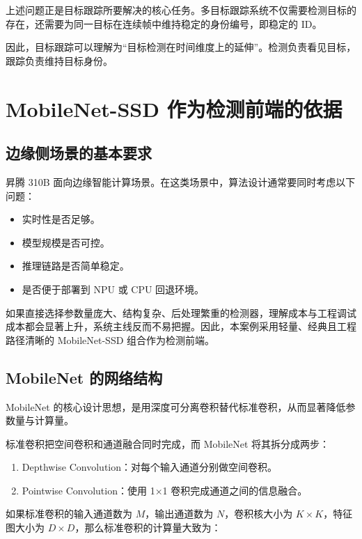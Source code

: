 上述问题正是目标跟踪所要解决的核心任务。多目标跟踪系统不仅需要检测目标的存在，还需要为同一目标在连续帧中维持稳定的身份编号，即稳定的
ID。

因此，目标跟踪可以理解为``目标检测在时间维度上的延伸''。检测负责看见目标，跟踪负责维持目标身份。

\section{MobileNet-SSD
作为检测前端的依据}\label{src-experiment-case2-h5}

\subsection{边缘侧场景的基本要求}\label{src-experiment-case2-h6}

昇腾 310B
面向边缘智能计算场景。在这类场景中，算法设计通常要同时考虑以下问题：

\begin{itemize}
\tightlist
\item
  实时性是否足够。
\item
  模型规模是否可控。
\item
  推理链路是否简单稳定。
\item
  是否便于部署到 NPU 或 CPU 回退环境。
\end{itemize}

如果直接选择参数量庞大、结构复杂、后处理繁重的检测器，理解成本与工程调试成本都会显著上升，系统主线反而不易把握。因此，本案例采用轻量、经典且工程路径清晰的
MobileNet-SSD 组合作为检测前端。

\subsection{MobileNet 的网络结构}\label{src-experiment-case2-h7}

MobileNet
的核心设计思想，是用深度可分离卷积替代标准卷积，从而显著降低参数量与计算量。

标准卷积把空间卷积和通道融合同时完成，而 MobileNet 将其拆分成两步：

\begin{enumerate}
\def\labelenumi{\arabic{enumi}.}
\tightlist
\item
  Depthwise Convolution：对每个输入通道分别做空间卷积。
\item
  Pointwise Convolution：使用 1×1 卷积完成通道之间的信息融合。
\end{enumerate}

如果标准卷积的输入通道数为 \(M\)，输出通道数为 \(N\)，卷积核大小为
\(K \times K\)，特征图大小为
\(D \times D\)，那么标准卷积的计算量大致为：

